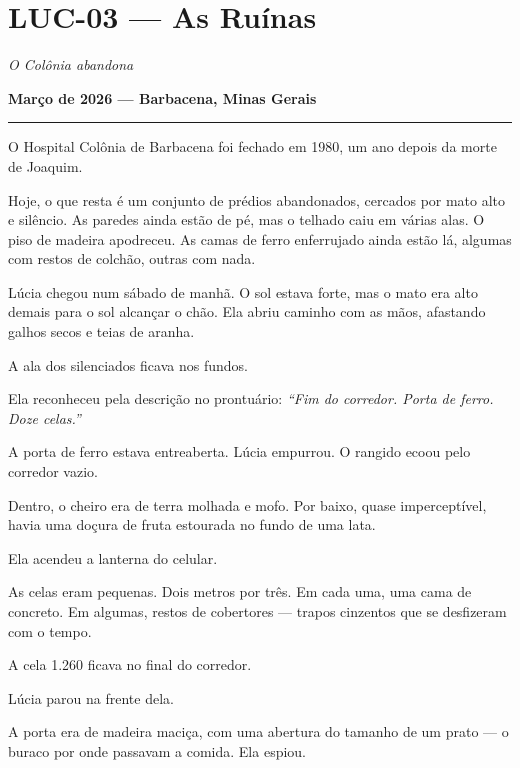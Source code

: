 \section*{\textbf{LUC-03} --- As Ruínas}

\noindent \textit{O Colônia abandona}

\noindent \textbf{Março de 2026 --- Barbacena, Minas Gerais}

\vspace{0.5em}\noindent\rule{\textwidth}{0.5pt}\vspace{0.5em}

\noindent O Hospital Colônia de Barbacena foi fechado em 1980, um ano depois da morte de Joaquim.

\noindent Hoje, o que resta é um conjunto de prédios abandonados, cercados por mato alto e silêncio. As paredes ainda estão de pé, mas o telhado caiu em várias alas. O piso de madeira apodreceu. As camas de ferro enferrujado ainda estão lá, algumas com restos de colchão, outras com nada.

\noindent Lúcia chegou num sábado de manhã. O sol estava forte, mas o mato era alto demais para o sol alcançar o chão. Ela abriu caminho com as mãos, afastando galhos secos e teias de aranha.

\noindent A ala dos silenciados ficava nos fundos.

\noindent Ela reconheceu pela descrição no prontuário: \textit{\textquotedblleft{}Fim do corredor. Porta de ferro. Doze celas.\textquotedblright{}}

\noindent A porta de ferro estava entreaberta. Lúcia empurrou. O rangido ecoou pelo corredor vazio.

\noindent Dentro, o cheiro era de terra molhada e mofo. Por baixo, quase imperceptível, havia uma doçura de fruta estourada no fundo de uma lata.

\noindent Ela acendeu a lanterna do celular.

\noindent As celas eram pequenas. Dois metros por três. Em cada uma, uma cama de concreto. Em algumas, restos de cobertores --- trapos cinzentos que se desfizeram com o tempo.

\noindent A cela 1.260 ficava no final do corredor.

\noindent Lúcia parou na frente dela.

\noindent A porta era de madeira maciça, com uma abertura do tamanho de um prato --- o buraco por onde passavam a comida. Ela espiou.


